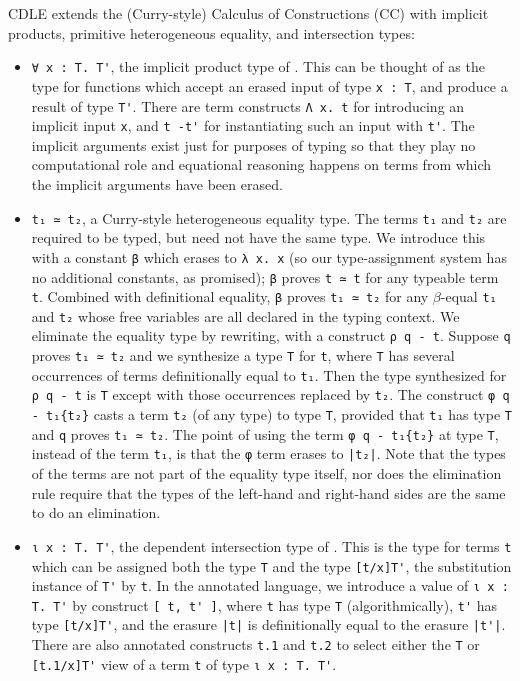 \documentclass[acmsmall,screen]{acmart}
\begin{document}
CDLE extends the (Curry-style) Calculus of Constructions (CC) with
implicit products, primitive heterogeneous equality,
and intersection types:
\begin{itemize}
\item \verb;∀ x : T. T';, the implicit product type of
  \citet{miquel01}.  This can be thought of as the type for
  functions which accept an erased input of type \verb;x : T;, and
  produce a result of type \verb;T';. There are term constructs
  \verb;Λ x. t; for introducing an implicit input \verb;x;, and
  \verb;t -t'; for instantiating such an input with \verb;t';. The
  implicit arguments exist just for purposes of typing so that they
  play no computational role and equational reasoning happens on terms
  from which the implicit arguments have been erased.

\item \verb;t₁ ≃ t₂;, a Curry-style heterogeneous equality type.  The terms
  \verb;t₁; and \verb;t₂; are required to be typed, but need not have
  the same type.  We introduce this with a constant \verb;β; which
  erases to \verb;λ x. x; (so our type-assignment system has no
  additional constants, as promised); \verb;β; proves \verb;t ≃ t; for
  any typeable term \verb;t;.  Combined with definitional equality,
  \verb;β; proves \verb;t₁ ≃ t₂; for any $\beta$-equal \verb;t₁; and
  \verb;t₂; whose free variables are all declared in the typing
  context.  We eliminate the equality type by rewriting, with a
  construct \verb;ρ q - t;.  Suppose \verb;q; proves \verb;t₁ ≃ t₂;
  and we synthesize a type \verb;T; for \verb;t;, where \verb;T; has
  several occurrences of terms definitionally equal to \verb;t₁;.
  Then the type synthesized for \verb;ρ q - t; is \verb;T; except with
  those occurrences replaced by \verb;t₂;.
  The construct \verb;φ q - t₁{t₂}; casts a term \verb;t₂; (of any type)
  to type \verb;T;, provided that \verb;t₁; has type \verb;T; and
  \verb;q; proves \verb;t₁ ≃ t₂;. The point of using the term
  \verb;φ q - t₁{t₂}; at type \verb;T;, instead of the term \verb;t₁;,
  is that the \verb;φ; term erases to \verb;|t₂|;.
  Note that the types of the
  terms are not part of the equality type itself, nor does the
  elimination rule require that the types of the left-hand and right-hand
  sides are the same to do an elimination.

\item \verb;ι x : T. T';, the dependent intersection type of
  \citet{kopylov03}.  This is the type for terms \verb;t; which
  can be assigned both the type \verb;T; and the type \verb;[t/x]T';,
  the substitution instance of \verb;T'; by \verb;t;.  In the
  annotated language, we introduce a value of \verb;ι x : T. T'; by
  construct \verb;[ t, t' ];, where \verb;t; has type \verb;T;
  (algorithmically), \verb;t'; has type \verb;[t/x]T';, and
  the erasure \verb;|t|; is definitionally equal to the erasure
  \verb;|t'|;.  There are also annotated constructs
  \verb;t.1; and \verb;t.2; to select either the \verb;T; or
  \verb;[t.1/x]T'; view of a term \verb;t; of type \verb;ι x : T. T';.
\end{itemize}
\end{document}
